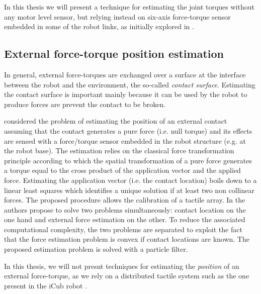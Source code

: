 In this thesis we will present a technique for estimating the joint torques without any motor level sensor, but relying instead on six-axis force-torque sensor embedded in some of the robot links, as initially explored in \cite{Fumagalli2012}.

\subsection{External force-torque position estimation}
In general, external force-torques are exchanged over a surface at the interface between the robot and the environment, the so-called \emph{contact surface}. Estimating the contact surface is important mainly because it can be used by the robot to produce forces are prevent the contact to be broken. 

\citep{DelPrete2011} considered the problem of estimating the position of an external contact assuming that the contact generates a pure force (i.e. null torque) and its effects are sensed with a force/torque sensor embedded in the robot structure (e.g. at the robot base). The estimation relies on the classical force transformation principle \cite[Section 3.8.3]{Siciliano2009} according to which the spatial transformation of a pure force generates a torque equal to the cross product of the application vector and the applied force. Estimating the application vector (i.e. the contact location) boils down to a linear least squares which identifies a unique solution if at least two non collinear forces. The proposed procedure allows the calibration of a tactile array. In \citep{Manuelli2016} the authors propose to solve two problems simultaneously: contact location on the one hand and external force estimation on the other. To reduce the associated computational complexity, the two problems are separated to exploit the fact that the force estimation problem is convex if contact locations are known. The proposed estimation problem is solved with a particle filter. 

In this thesis, we will not presnt techniques for estimating the \emph{position} of an external force-torque, as we rely on  a distributed tactile system such as the one present in the iCub robot \cite{maiolino2013,DelPrete2011}.

